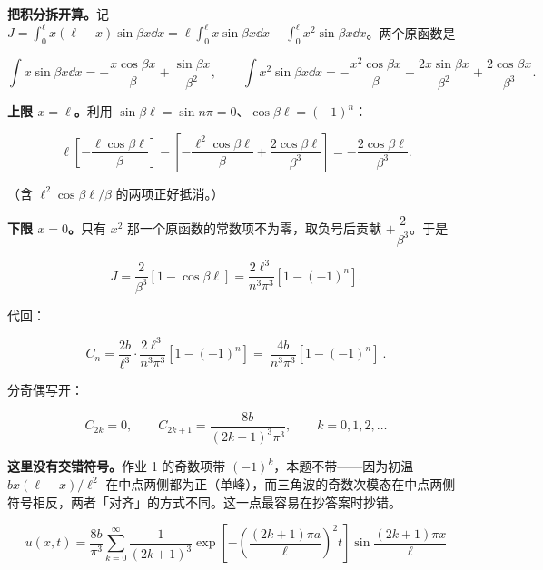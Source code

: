 \documentclass[11pt]{ctexart}
\begin{document}
\textbf{把积分拆开算。}记 $J=\int_0^{\ell}x(\ell-x)\sin\beta x\dd x=\ell\int_0^\ell x\sin\beta x\dd x-\int_0^\ell x^2\sin\beta x\dd x$。两个原函数是

\[
\int x\sin\beta x\dd x=-\frac{x\cos\beta x}{\beta}+\frac{\sin\beta x}{\beta^2},
\qquad
\int x^2\sin\beta x\dd x=-\frac{x^2\cos\beta x}{\beta}+\frac{2x\sin\beta x}{\beta^2}+\frac{2\cos\beta x}{\beta^3}.
\]

\textbf{上限 $x=\ell$。}利用 $\sin\beta\ell=\sin n\pi=0$、$\cos\beta\ell=(-1)^n$：

\[
\ell\left[-\frac{\ell\cos\beta\ell}{\beta}\right]-\left[-\frac{\ell^2\cos\beta\ell}{\beta}+\frac{2\cos\beta\ell}{\beta^3}\right]
=-\frac{2\cos\beta\ell}{\beta^3}.
\]

（含 $\ell^2\cos\beta\ell/\beta$ 的两项正好抵消。）

\textbf{下限 $x=0$。}只有 $x^2$ 那一个原函数的常数项不为零，取负号后贡献 $+\dfrac{2}{\beta^3}$。于是

\[
J=\frac{2}{\beta^3}\left[1-\cos\beta\ell\right]
=\frac{2\ell^3}{n^3\pi^3}\left[1-(-1)^n\right].
\]

代回：

\[
C_n=\frac{2b}{\ell^3}\cdot\frac{2\ell^3}{n^3\pi^3}\left[1-(-1)^n\right]
=\boxed{\ \frac{4b}{n^3\pi^3}\left[1-(-1)^n\right]\ }.
\]

分奇偶写开：

\[
C_{2k}=0,
\qquad
C_{2k+1}=\frac{8b}{(2k+1)^3\pi^3},
\qquad k=0,1,2,\dots
\]

\textbf{这里没有交错符号。}作业 1 的奇数项带 $(-1)^k$，本题不带——因为初温 $bx(\ell-x)/\ell^2$ 在中点两侧都为正（单峰），而三角波的奇数次模态在中点两侧符号相反，两者「对齐」的方式不同。这一点最容易在抄答案时抄错。


\[
\boxed{\;
u(x,t)=\frac{8b}{\pi^3}\sum_{k=0}^{\infty}\frac{1}{(2k+1)^3}
\exp\left[-\left(\frac{(2k+1)\pi a}{\ell}\right)^2t\right]
\sin\frac{(2k+1)\pi x}{\ell}
\;}
\]

\end{document}
